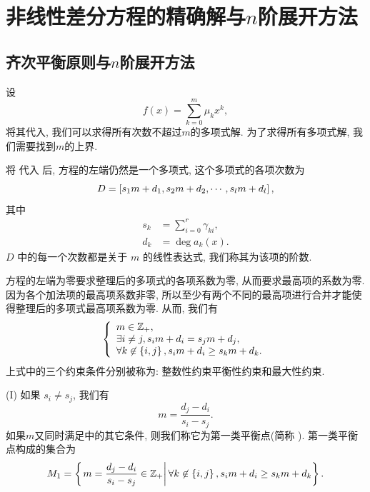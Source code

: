 \chapter{非线性差分方程的精确解与$n$阶展开方法}
\section{齐次平衡原则与$n$阶展开方法}

设
\begin{equation}
f(x)=\sum_{k=0}^m{\mu_kx^k},
\label{fm1}
\end{equation}
将其代入, 我们可以求得所有次数不超过$m$的多项式解. 为了求得所有多项式解, 我们需要找到$m$的上界.

将 代入 后, 方程的左端仍然是一个多项式, 这个多项式的各项次数为
\begin{equation}
D = \left[s_1 m+d_1,s_2 m+d_2,\cdots,s_l m+d_l\right],
\end{equation}
其中
\begin{equation}
\begin{split}
s_k&=\sum_{i=0}^r{\gamma_{ki}}, \\
d_k&=\deg a_k(x).
\end{split}
\label{eq-sd}
\end{equation}
$D$ 中的每一个次数都是关于 $m$ 的线性表达式, 我们称其为该项的阶数.

方程的左端为零要求整理后的多项式的各项系数为零, 从而要求最高项的系数为零. 因为各个加法项的最高项系数非零, 所以至少有两个不同的最高项进行合并才能使得整理后的多项式最高项系数为零. 从而, 我们有 
\begin{equation}
\left\{
\begin{array}{l}
m\in \mathbb Z_+  ,                                     \\
\exists i\neq j, s_i m+d_i=s_j m+d_j    ,               \\
\forall k \not\in \left\{i,j\right\}, s_i m+d_i\ge s_k m+d_k .
\end{array}
\right.
\label{cond}
\end{equation}
上式中的三个约束条件分别被称为: 整数性约束\zdh 平衡性约束和最大性约束. 

(I) 如果 $s_i \neq s_j$, 我们有 
\begin{equation}
m=\frac{d_j-d_i}{s_i-s_j}.
\end{equation}
如果$m$又同时满足中的其它条件, 则我们称它为第一类平衡点(简称 \BPone{}). 第一类平衡点构成的集合为 
\begin{equation}
M_1=\left\{\left. m=\frac{d_j-d_i}{s_i-s_j}\in \mathbb Z_+\right\vert \forall k\not\in \left\{i,j\right\}, s_i m+d_i\ge s_k m+d_k\right\}.
\end{equation}

